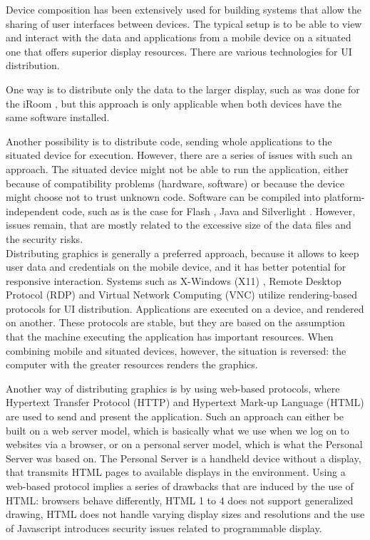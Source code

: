 Device composition has been extensively used for building systems that allow the sharing of user interfaces between devices.
The typical setup is to be able to view and interact with the data and applications from a mobile device on a situated one that offers superior display resources.
There are various technologies for UI distribution.

One way is to distribute only the data to the larger display, such as was done for the iRoom \citep{Johanson:2002:iroom}, but this approach is only applicable when both devices have the same software installed.

Another possibility is to distribute code, sending whole applications to the situated device for execution.
However, there are a series of issues with such an approach.
The situated device might not be able to run the application, either because of compatibility problems (hardware, software) or because the device might choose not to trust unknown code.
Software can be compiled into platform-independent code, such as is the case for Flash \citep{flash}, Java \citep{java} and Silverlight \citep{silverlight}.
However, issues remain, that are mostly related to the excessive size of the data files and the security risks.
\\
\linebreak
Distributing graphics is generally a preferred approach, because it allows to keep user data and credentials on the mobile device, and it has better potential for responsive interaction.
Systems such as X-Windows (X11) \citep{Scheifler:1986:x11}, Remote Desktop Protocol (RDP) \citep{Tritsch:2003:rdp} and Virtual Network Computing (VNC) \citep{Richardson:1998:vnc} utilize rendering-based protocols for UI distribution.
Applications are executed on a device, and rendered on another.
These protocols are stable, but they are based on the assumption that the machine executing the application has important resources.
When combining mobile and situated devices, however, the situation is reversed: the computer with the greater resources renders the graphics.

Another way of distributing graphics is by using web-based protocols, where Hypertext Transfer Protocol (HTTP) and Hypertext Mark-up Language (HTML) are used to send and present the application.
Such an approach can either be built on a web server model, which is basically what we use when we log on to websites via a browser, or on a personal server model, which is what the Personal Server \citep{Want:2002:personalserver} was based on.
The Personal Server is a handheld device without a display, that transmits HTML pages to available displays in the environment.
Using a web-based protocol implies a series of drawbacks that are induced by the use of HTML: browsers behave differently, HTML 1 to 4 does not support generalized drawing, HTML does not handle varying display sizes and resolutions and the use of Javascript introduces security issues related to programmable display.

